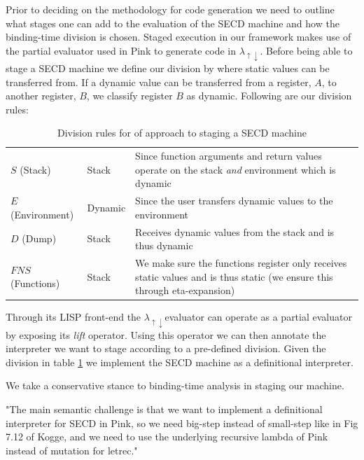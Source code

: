 \documentclass[fleqn]{article}
\theoremstyle{definition}
\newcommand{\mslang}{$\lambda_{\uparrow\downarrow}$}
\begin{document}
Prior to deciding on the methodology for code generation we need to outline what stages one can add to the evaluation of the SECD machine and how the binding-time division is chosen. Staged execution in our framework makes use of the partial evaluator used in Pink \cite{amin2017collapsing} to generate code in \mslang. Before being able to stage a SECD machine we define our division by where static values can be transferred from. If a dynamic value can be transferred from a register, $A$, to another register, $B$, we classify register $B$ as dynamic. Following are our division rules:
\begin{table}[!htbp]
  \centering
  \caption{Division rules for of approach to staging a SECD machine}
  \label{tbl:secd_division}
  \begin{tabular}{|p{3cm}|p{3cm}|p{6cm}|}
 	\toprule
 	\thead{SECD Register}	&	\thead{Classification}	&	\thead{Reason}	\\ \hline

 	\midrule
	$S$ (Stack)				&	Stack				&	Since function arguments and return values operate on the stack \textit{and} environment which is dynamic \\ \hline

	$E$ (Environment)		&	Dynamic			&	Since the user transfers dynamic values to the environment \\ \hline

	$D$ (Dump)				&	Stack				&	Receives dynamic values from the stack and is thus dynamic \\ \hline

	$FNS$ (Functions)		&	Stack				&	We make sure the functions register only receives static values and is thus static (we ensure this through eta-expansion) \\

	\bottomrule
  \end{tabular}
\end{table}

Through its LISP front-end the \mslang evaluator can operate as a partial evaluator by exposing its \textit{lift} operator. Using this operator we can then annotate the interpreter we want to stage according to a pre-defined division. Given the division in table \ref{tbl:secd_division} we implement the SECD machine as a definitional interpreter.

We take a conservative stance to binding-time analysis in staging our machine.

"The main semantic challenge is that we want to implement a definitional interpreter for SECD in Pink, so we need big-step instead of small-step like in Fig 7.12 of Kogge, and we need to use the underlying recursive lambda of Pink instead of mutation for letrec."
\end{document}
